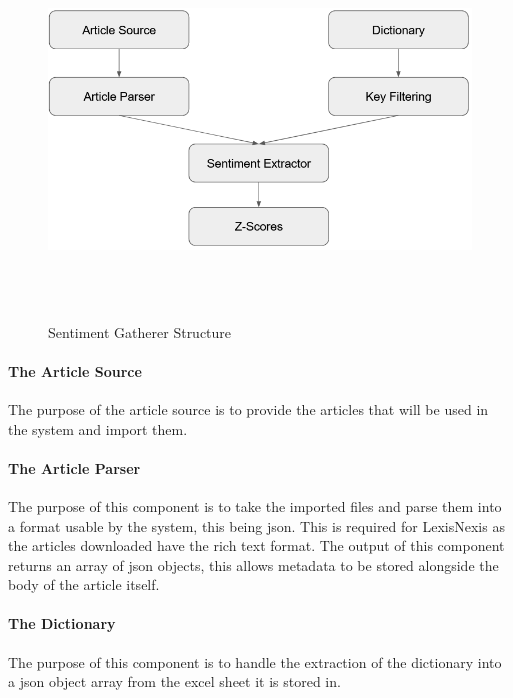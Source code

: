 \begin{figure}[h]
    \centering
    \includegraphics[width=15cm,height=10cm,keepaspectratio]{design/SentimentGathererStructure.png}
    \caption{Sentiment Gatherer Structure}
    \label{fig:sentimentgathererstructure}
\end{figure}

\paragraph{The Article Source}

The purpose of the article source is to provide the articles that will be used in the system and import them.

\paragraph{The Article Parser}

The purpose of this component is to take the imported files and parse them into a format usable by the system, this being json. This is required for LexisNexis as the articles downloaded have the rich text format. The output of this component returns an array of json objects, this allows metadata to be stored alongside the body of the article itself.

\paragraph{The Dictionary}

The purpose of this component is to handle the extraction of the dictionary into a json object array from the excel sheet it is stored in.

